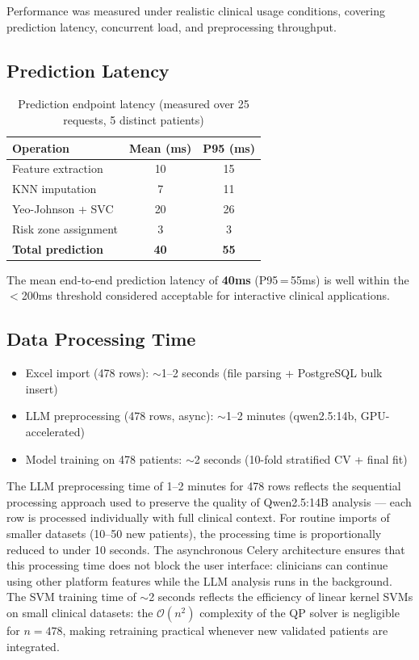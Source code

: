 \documentclass[12pt,a4paper,twoside]{report}
\begin{document}
Performance was measured under realistic clinical usage conditions, covering prediction latency, concurrent load, and preprocessing throughput.

\subsection{Prediction Latency}

\begin{table}[htbp]
\centering
\caption{Prediction endpoint latency (measured over 25 requests, 5 distinct patients)}
\label{tab:latency}
\begin{tabular}{lcc}
\toprule
\textbf{Operation} & \textbf{Mean (ms)} & \textbf{P95 (ms)} \\
\midrule
Feature extraction & 10 & 15 \\
KNN imputation & 7 & 11 \\
Yeo-Johnson + SVC & 20 & 26 \\
Risk zone assignment & 3 & 3 \\
\midrule
\textbf{Total prediction} & \textbf{40} & \textbf{55} \\
\bottomrule
\end{tabular}
\end{table}

The mean end-to-end prediction latency of \textbf{40ms} (P95\,=\,55ms) is well within the $<$200ms threshold considered acceptable for interactive clinical applications.

\subsection{Data Processing Time}

\begin{itemize}
  \item Excel import (478 rows): $\sim$1--2 seconds (file parsing + PostgreSQL bulk insert)
  \item LLM preprocessing (478 rows, async): $\sim$1--2 minutes (qwen2.5:14b, GPU-accelerated)
  \item Model training on 478 patients: $\sim$2 seconds (10-fold stratified CV + final fit)
\end{itemize}

The LLM preprocessing time of 1--2 minutes for 478 rows reflects the sequential processing approach used to preserve the quality of Qwen2.5:14B analysis --- each row is processed individually with full clinical context. For routine imports of smaller datasets (10--50 new patients), the processing time is proportionally reduced to under 10 seconds. The asynchronous Celery architecture ensures that this processing time does not block the user interface: clinicians can continue using other platform features while the LLM analysis runs in the background. The SVM training time of $\sim$2 seconds reflects the efficiency of linear kernel SVMs on small clinical datasets: the $\mathcal{O}(n^2)$ complexity of the QP solver is negligible for $n=478$, making retraining practical whenever new validated patients are integrated.
\end{document}
